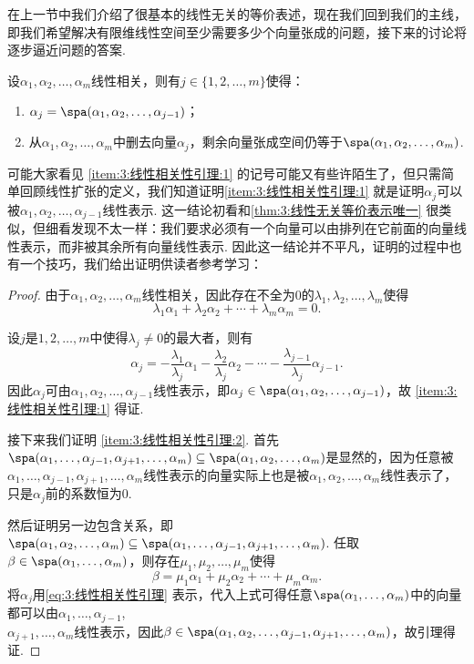 在上一节中我们介绍了很基本的线性无关的等价表述，现在我们回到我们的主线，即我们希望解决有限维线性空间至少需要多少个向量张成的问题，接下来的讨论将逐步逼近问题的答案.
\begin{lemma}\label{lem:3:线性相关性引理}
    设$\alpha_1,\alpha_2,\ldots,\alpha_m$线性相关，则有$j\in\{1,2,\ldots,m\}$使得：
    \begin{enumerate}
        \item \label{item:3:线性相关性引理:1}
              $\alpha_j=\spa(\alpha_1,\alpha_2,\ldots,\alpha_{j-1})$；

        \item \label{item:3:线性相关性引理:2}
              从$\alpha_1,\alpha_2,\ldots,\alpha_m$中删去向量$\alpha_j$，剩余向量张成空间仍等于$\spa(\alpha_1,\alpha_2,\ldots,\alpha_m)$.
    \end{enumerate}
\end{lemma}
可能大家看见 \ref*{item:3:线性相关性引理:1} 的记号可能又有些许陌生了，但只需简单回顾线性扩张的定义，我们知道证明\ref*{item:3:线性相关性引理:1} 就是证明$\alpha_j$可以被$\alpha_1,\alpha_2,\ldots,\alpha_{j-1}$线性表示. 这一结论初看和\autoref{thm:3:线性无关等价表示唯一} 很类似，但细看发现不太一样：我们要求必须有一个向量可以由排列在它前面的向量线性表示，而非被其余所有向量线性表示. 因此这一结论并不平凡，证明的过程中也有一个技巧，我们给出证明供读者参考学习：

\begin{proof}
    由于$\alpha_1,\alpha_2,\ldots,\alpha_m$线性相关，因此存在不全为0的$\lambda_1,\lambda_2,\ldots,\lambda_m$使得
    \[\lambda_1\alpha_1+\lambda_2\alpha_2+\cdots+\lambda_m\alpha_m=0.\]

    设$j$是$1,2,\ldots,m$中使得$\lambda_j\neq 0$的最大者，则有
    \begin{equation}\label{eq:3:线性相关性引理}
        \alpha_j=-\frac{\lambda_1}{\lambda_j}\alpha_1-\frac{\lambda_2}{\lambda_j}\alpha_2-\cdots-\frac{\lambda_{j-1}}{\lambda_j}\alpha_{j-1}.
    \end{equation}
    因此$\alpha_j$可由$\alpha_1,\alpha_2,\ldots,\alpha_{j-1}$线性表示，即$\alpha_j\in\spa(\alpha_1,\alpha_2,\ldots,\alpha_{j-1})$，故 \ref*{item:3:线性相关性引理:1} 得证.

    接下来我们证明 \ref*{item:3:线性相关性引理:2}. 首先$\spa(\alpha_1,\ldots,\alpha_{j-1},\alpha_{j+1},\ldots,\alpha_m)\subseteq\spa(\alpha_1,\alpha_2,\ldots,\alpha_m)$是显然的，因为任意被$\alpha_1,\ldots,\alpha_{j-1},\alpha_{j+1},\ldots,\alpha_m$线性表示的向量实际上也是被$\alpha_1,\alpha_2,\ldots,\alpha_m$线性表示了，只是$\alpha_j$前的系数恒为0.

    然后证明另一边包含关系，即$\spa(\alpha_1,\alpha_2,\ldots,\alpha_m)\subseteq\spa(\alpha_1,\ldots,\alpha_{j-1},\alpha_{j+1},\ldots,\alpha_m)$. 任取$\beta\in\spa(\alpha_1,\ldots,\alpha_m)$，则存在$\mu_1,\mu_2,\ldots,\mu_m$使得
    \[\beta=\mu_1\alpha_1+\mu_2\alpha_2+\cdots+\mu_m\alpha_m.\]
    将$\alpha_j$用\autoref{eq:3:线性相关性引理} 表示，代入上式可得任意$\spa(\alpha_1,\ldots,\alpha_m)$中的向量都可以由$\alpha_1,\ldots,\alpha_{j-1}$,\\$\alpha_{j+1},\ldots,\alpha_m$线性表示，因此$\beta\in\spa(\alpha_1,\alpha_2,\ldots,\alpha_{j-1},\alpha_{j+1},\ldots,\alpha_m)$，故引理得证.
\end{proof}

